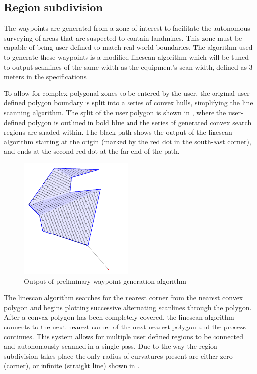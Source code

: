 \documentclass[main.tex]{subfiles}
\begin{document}
\subsection{Region subdivision}
The waypoints are generated from a zone of interest to facilitate the autonomous surveying of areas that are suspected to contain landmines. This zone must be capable of being user defined to match real world boundaries. The algorithm used to generate these waypoints is a modified linescan algorithm which will be tuned to output scanlines of the same width as the equipment's scan width, defined as 3 meters in the specifications.

To allow for complex polygonal zones to be entered by the user, the original user-defined polygon boundary is split into a series of convex hulls, simplifying the line scanning algorithm. The split of the user polygon is shown in , where the user-defined polygon is outlined in bold blue and the series of generated convex search regions are shaded within. The black path shows the output of the linescan algorithm starting at the origin (marked by the red dot in the south-east corner), and ends at the second red dot at the far end of the path. 
\begin{figure}[ht]
\includegraphics[width=0.5\textwidth]{4-DetailedDesign/lineScanAlgorithm.png}
\centering
\caption{Output of preliminary waypoint generation algorithm} 
\end{figure}
The linescan algorithm searches for the nearest corner from the nearest convex polygon and begins plotting successive alternating scanlines through the polygon. After a convex polygon has been completely covered, the linescan algorithm connects to the next nearest corner of the next nearest polygon and the process continues. This system allows for multiple user defined regions to be connected and autonomously scanned in a single pass. Due to the way the region subdivision takes place the only radius of curvatures present are either zero (corner), or infinite (straight line) shown in .
\end{document}
